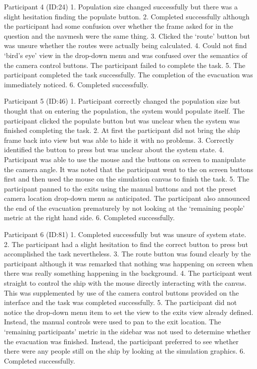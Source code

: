 Participant 4 (ID:24)
1. Population size changed successfully but there was a slight hesitation finding the populate button.
2. Completed successfully although the participant had some confusion over whether the frame asked for in the question and the navmesh were the same thing.
3. Clicked the ‘route’ button but was unsure whether the routes were actually being calculated.
4. Could not find ‘bird’s eye’ view in the drop-down menu and was confused over the semantics of the camera control buttons. The participant failed to complete the task.
5. The participant completed the task successfully. The completion of the evacuation was immediately noticed.
6. Completed successfully.

Participant 5 (ID:46)
1. Participant correctly changed the population size but thought that on entering the population, the system would populate itself. The participant clicked the populate button but was unclear when the system was finished completing the task.
2. At first the participant did not bring the ship frame back into view but was able to hide it with no problems.
3. Correctly identified the button to press but was unclear about the system state.
4. Participant was able to use the mouse and the buttons on screen to manipulate the camera angle. It was noted that the participant went to the on screen buttons first and then used the mouse on the simulation canvas to finish the task.
5. The participant panned to the exits using the manual buttons and not the preset camera location drop-down menu as anticipated. The participant also announced the end of the evacuation prematurely by not looking at the ‘remaining people’ metric at the right hand side.
6. Completed successfully.  

Participant 6 (ID:81)
1. Completed successfully but was unsure of system state.
2. The participant had a slight hesitation to find the correct button to press but accomplished the task nevertheless.
3. The route button was found clearly by the participant although it was remarked that nothing was happening on screen when there was really something happening in the background.
4. The participant went straight to control the ship with the mouse directly interacting with the canvas. This was supplemented by use of the camera control buttons provided on the interface and the task was completed successfully.
5. The participant did not notice the drop-down menu item to set the view to the exits view already defined. Instead, the manual controls were used to pan to the exit location. The ‘remaining participants’ metric in the sidebar was not used to determine whether the evacuation was finished. Instead, the participant preferred to see whether there were any people still on the ship by looking at the simulation graphics.
6. Completed successfully.

